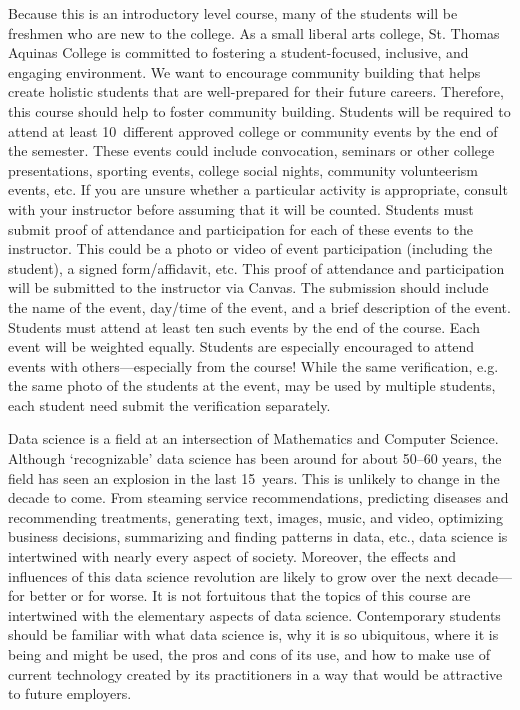 \documentclass[11pt,letterpaper]{article}
\begin{document}
Because this is an introductory level course, many of the students will be freshmen who are new to the college. As a small liberal arts college, St. Thomas Aquinas College is committed to fostering a student-focused, inclusive, and engaging environment. We want to encourage community building that helps create holistic students that are well-prepared for their future careers. Therefore, this course should help to foster community building. Students will be required to attend at least 10~different approved college or community events by the end of the semester. These events could include convocation, seminars or other college presentations, sporting events, college social nights, community volunteerism events, etc. If you are unsure whether a particular activity is appropriate, consult with your instructor before assuming that it will be counted. Students must submit proof of attendance and participation for each of these events to the instructor. This could be a photo or video of event participation (including the student), a signed form/affidavit, etc. This proof of attendance and participation will be submitted to the instructor via Canvas. The submission should include the name of the event, day/time of the event, and a brief description of the event. Students must attend at least ten such events by the end of the course. Each event will be weighted equally. Students are especially encouraged to attend events with others---especially from the course! While the same verification, e.g. the same photo of the students at the event, may be used by multiple students, each student need submit the verification separately. \pspace



Data science is a field at an intersection of Mathematics and Computer Science. Although `recognizable' data science has been around for about 50--60 years, the field has seen an explosion in the last 15~years. This is unlikely to change in the decade to come. From steaming service recommendations, predicting diseases and recommending treatments, generating text, images, music, and video, optimizing business decisions, summarizing and finding patterns in data, etc., data science is intertwined with nearly every aspect of society. Moreover, the effects and influences of this data science revolution are likely to grow over the next decade---for better or for worse. It is not fortuitous that the topics of this course are intertwined with the elementary aspects of data science. Contemporary students should be familiar with what data science is, why it is so ubiquitous, where it is being and might be used, the pros and cons of its use, and how to make use of current technology created by its practitioners in a way that would be attractive to future employers. \par\vspace{0.4cm}
\end{document}
